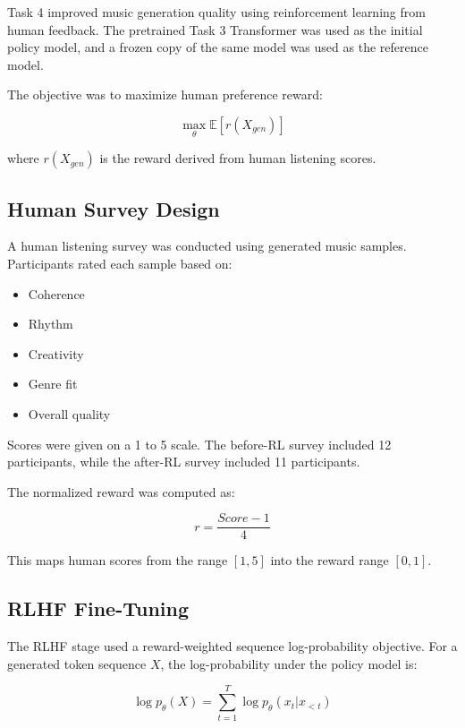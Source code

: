 \documentclass[conference]{IEEEtran}
\begin{document}
Task 4 improved music generation quality using reinforcement learning from human feedback. The pretrained Task 3 Transformer was used as the initial policy model, and a frozen copy of the same model was used as the reference model.

The objective was to maximize human preference reward:

\begin{equation}
\max_{\theta} \mathbb{E}[r(X_{gen})]
\end{equation}

where $r(X_{gen})$ is the reward derived from human listening scores.

\subsection{Human Survey Design}

A human listening survey was conducted using generated music samples. Participants rated each sample based on:

\begin{itemize}
    \item Coherence
    \item Rhythm
    \item Creativity
    \item Genre fit
    \item Overall quality
\end{itemize}

Scores were given on a 1 to 5 scale. The before-RL survey included 12 participants, while the after-RL survey included 11 participants.

The normalized reward was computed as:

\begin{equation}
r = \frac{Score - 1}{4}
\end{equation}

This maps human scores from the range $[1,5]$ into the reward range $[0,1]$.

\subsection{RLHF Fine-Tuning}

The RLHF stage used a reward-weighted sequence log-probability objective. For a generated token sequence $X$, the log-probability under the policy model is:

\begin{equation}
\log p_{\theta}(X) = \sum_{t=1}^{T} \log p_{\theta}(x_t|x_{<t})
\end{equation}
\end{document}
